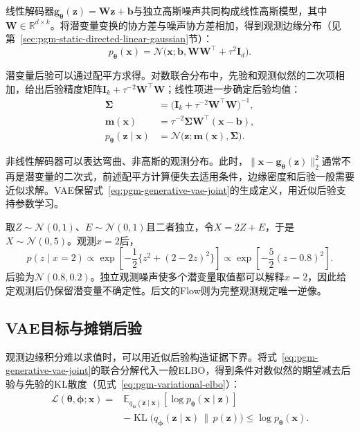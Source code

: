 线性解码器$\bm{g}_{\bm{\theta}}(\bm{z})=\bm{W}\bm{z}+\bm{b}$与独立高斯噪声共同构成线性高斯模型，其中$\bm{W}\in\mathbb{R}^{d\times k}$。将潜变量变换的协方差与噪声协方差相加，得到观测边缘分布（见第~\ref{sec:pgm-static-directed-linear-gaussian}节）：
\[
  p_{\bm{\theta}}(\bm{x})
  =\mathcal{N}\bigl(\bm{x};
    \bm{b},\bm{W}\bm{W}^{\top}+\tau^2\bm{I}_d\bigr).
\]

潜变量后验可以通过配平方求得。对数联合分布中，先验和观测似然的二次项相加，给出后验精度矩阵$\bm{I}_k+\tau^{-2}\bm{W}^{\top}\bm{W}$；线性项进一步确定后验均值：
\begin{equation}
  \label{eq:pgm-generative-linear-posterior}
  \begin{aligned}
    \bm{\Sigma}
      &=\bigl(\bm{I}_k+\tau^{-2}\bm{W}^{\top}\bm{W}\bigr)^{-1},\\
    \bm{m}(\bm{x})
      &=\tau^{-2}\bm{\Sigma}\bm{W}^{\top}(\bm{x}-\bm{b}),\\
    p_{\bm{\theta}}(\bm{z}\mid\bm{x})
      &=\mathcal{N}\bigl(\bm{z};\bm{m}(\bm{x}),\bm{\Sigma}\bigr).
  \end{aligned}
\end{equation}

非线性解码器可以表达弯曲、非高斯的观测分布。此时，$\lVert\bm{x}-\bm{g}_{\bm{\theta}}(\bm{z})\rVert_2^2$通常不再是潜变量的二次式，前述配平方计算便失去适用条件，边缘密度和后验一般需要近似求解。VAE保留式~\eqref{eq:pgm-generative-vae-joint}的生成定义，用近似后验支持参数学习。

\begin{example}[同一观测分布的潜变量解释]
  \label{ex:pgm-generative-gaussian-latent}
  取$Z\sim\mathcal{N}(0,1)$、$E\sim\mathcal{N}(0,1)$且二者独立，令$X=2Z+E$，于是$X\sim\mathcal{N}(0,5)$。观测$x=2$后，
  \[
    p(z\mid x=2)\propto
    \exp\left[-\frac{1}{2}\{z^2+(2-2z)^2\}\right]
    \propto\exp\left[-\frac{5}{2}(z-0.8)^2\right].
  \]
  后验为$\mathcal{N}(0.8,0.2)$。独立观测噪声使多个潜变量取值都可以解释$x=2$，因此给定观测后仍保留潜变量不确定性。后文的Flow则为完整观测规定唯一逆像。
\end{example}

\subsection{VAE目标与摊销后验}
\label{sec:pgm-generative-vae-objective}

观测边缘积分难以求值时，可以用近似后验构造证据下界。将式~\eqref{eq:pgm-generative-vae-joint}的联合分解代入一般ELBO，得到条件对数似然的期望减去后验与先验的KL散度（见式~\eqref{eq:pgm-variational-elbo}）：
\begin{equation}
  \label{eq:pgm-generative-vae-elbo}
  \begin{aligned}
    \mathcal{L}(\bm{\theta},\bm{\phi};\bm{x})
    ={}&\mathbb{E}_{q_{\bm{\phi}}(\bm{z}\mid\bm{x})}
       [\log p_{\bm{\theta}}(\bm{x}\mid\bm{z})]\\
      &-\operatorname{KL}\bigl(
       q_{\bm{\phi}}(\bm{z}\mid\bm{x})\,\|\,p(\bm{z})\bigr)
      \leq\log p_{\bm{\theta}}(\bm{x}).
  \end{aligned}
\end{equation}

